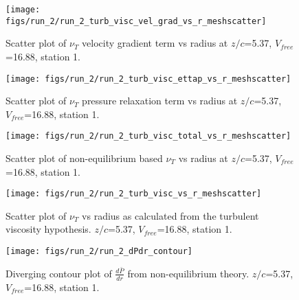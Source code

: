 \begin{figure}[H]
\centering
\texttt{[image: figs/run\_2/run\_2\_turb\_visc\_vel\_grad\_vs\_r\_meshscatter]}
\caption{Scatter plot of $\nu_T$ velocity gradient term vs radius at $z/c$=5.37, $V_{free}$=16.88, station 1.}
\end{figure}


\begin{figure}[H]
\centering
\texttt{[image: figs/run\_2/run\_2\_turb\_visc\_ettap\_vs\_r\_meshscatter]}
\caption{Scatter plot of $\nu_T$ pressure relaxation term vs radius at $z/c$=5.37, $V_{free}$=16.88, station 1.}
\end{figure}


\begin{figure}[H]
\centering
\texttt{[image: figs/run\_2/run\_2\_turb\_visc\_total\_vs\_r\_meshscatter]}
\caption{Scatter plot of non-equilibrium based $\nu_T$ vs radius at $z/c$=5.37, $V_{free}$=16.88, station 1.}
\end{figure}


\begin{figure}[H]
\centering
\texttt{[image: figs/run\_2/run\_2\_turb\_visc\_vs\_r\_meshscatter]}
\caption{Scatter plot of $\nu_T$ vs radius as calculated from the turbulent viscosity hypothesis. $z/c$=5.37, $V_{free}$=16.88, station 1.}
\end{figure}


\begin{figure}[H]
\centering
\texttt{[image: figs/run\_2/run\_2\_dPdr\_contour]}
\caption{Diverging contour plot of $\frac{d\bar{P}}{dr}$ from non-equilibrium theory. $z/c$=5.37, $V_{free}$=16.88, station 1.}
\end{figure}


